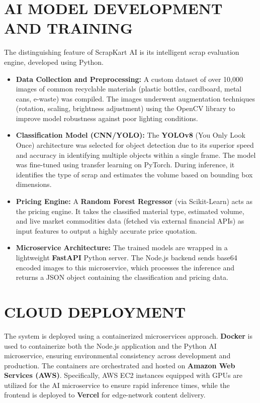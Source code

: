 \section{AI MODEL DEVELOPMENT AND TRAINING}
The distinguishing feature of ScrapKart AI is its intelligent scrap evaluation engine, developed using Python.
\begin{itemize}
    \item \textbf{Data Collection and Preprocessing:} A custom dataset of over 10,000 images of common recyclable materials (plastic bottles, cardboard, metal cans, e-waste) was compiled. The images underwent augmentation techniques (rotation, scaling, brightness adjustment) using the OpenCV library to improve model robustness against poor lighting conditions.
    \item \textbf{Classification Model (CNN/YOLO):} The \textbf{YOLOv8} (You Only Look Once) architecture was selected for object detection due to its superior speed and accuracy in identifying multiple objects within a single frame. The model was fine-tuned using transfer learning on PyTorch. During inference, it identifies the type of scrap and estimates the volume based on bounding box dimensions.
    \item \textbf{Pricing Engine:} A \textbf{Random Forest Regressor} (via Scikit-Learn) acts as the pricing engine. It takes the classified material type, estimated volume, and live market commodities data (fetched via external financial APIs) as input features to output a highly accurate price quotation.
    \item \textbf{Microservice Architecture:} The trained models are wrapped in a lightweight \textbf{FastAPI} Python server. The Node.js backend sends base64 encoded images to this microservice, which processes the inference and returns a JSON object containing the classification and pricing data.
\end{itemize}

\section{CLOUD DEPLOYMENT}
The system is deployed using a containerized microservices approach. \textbf{Docker} is used to containerize both the Node.js application and the Python AI microservice, ensuring environmental consistency across development and production. The containers are orchestrated and hosted on \textbf{Amazon Web Services (AWS)}. Specifically, AWS EC2 instances equipped with GPUs are utilized for the AI microservice to ensure rapid inference times, while the frontend is deployed to \textbf{Vercel} for edge-network content delivery.
